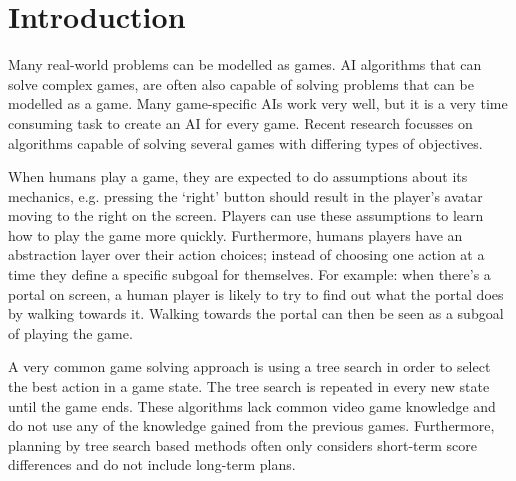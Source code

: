 \section{Introduction}
\label{sec:introduction}
%

Many real-world problems can be modelled as games. AI algorithms that can solve
complex games, are often also capable of solving problems that can be modelled
as a game. Many game-specific AIs work very well, but it is a very time
consuming task to create an AI for every game. Recent research
focusses on algorithms capable of solving several games with differing types of
objectives. 


When humans play a game, they are expected to do assumptions about
its mechanics, e.g. pressing the `right' button should result in the player's
avatar moving to the right on the screen. Players can use these assumptions to
learn how to play the game more quickly. Furthermore, humans players 
have an abstraction layer over their action choices; instead of
choosing one action at a time they define a specific subgoal for themselves. 
For example: when there's a portal on screen, a human player is
likely to try to find out what the portal does by walking towards it. Walking
towards the portal can then be seen as a subgoal of playing the game.

A very common game solving approach is using a tree search in order to select
the best action in a game state. The tree search is repeated in every new state
until the game ends. These algorithms lack common video game knowledge and do
not use any of the knowledge gained from the previous games.
Furthermore, planning by tree search based methods often only considers
short-term score differences and do not include long-term plans. 

